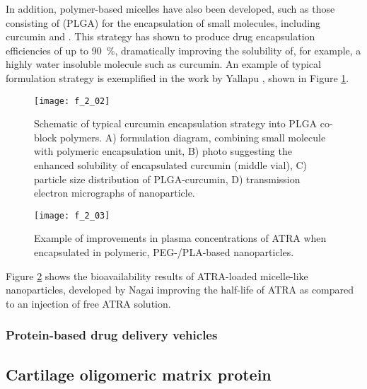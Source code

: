 \begin{refsection}
In addition, polymer-based micelles have also been developed, such as those
consisting of  (PLGA) for the
encapsulation of small molecules, including curcumin and
.\cite{Li2009,Yallapu2010b} This strategy has
shown to produce drug encapsulation efficiencies of up to \SI{90}{\percent},
dramatically improving the solubility of, for example, a highly water insoluble
molecule such as curcumin. An example of typical formulation strategy is
exemplified in the work by Yallapu , shown in Figure
\ref{fig:PLA_curcumin_example}.\cite{Yallapu2010b}
\begin{figure}[h!] \centering \texttt{[image: f\_2\_02]}
    \caption[Schematic of typical curcumin encapsulation strategy into PLGA
        co-block polymers.
    ]{Schematic of typical curcumin encapsulation strategy into PLGA co-block
    polymers. A) formulation diagram, combining small molecule with polymeric
encapsulation unit, B) photo suggesting the enhanced solubility of encapsulated
curcumin (middle vial), C) particle size distribution of PLGA-curcumin, D)
transmission electron micrographs of
nanoparticle.\cite{Yallapu2010b}}\label{fig:PLA_curcumin_example} \end{figure}
\begin{figure}[h!] \centering \texttt{[image: f\_2\_03]}
    \caption[Example of improvements in plasma concentrations of ATRA when
    encapsulated in polymeric, PEG-/PLA-based nanoparticles.]{Example of improvements in plasma concentrations of ATRA when
    encapsulated in polymeric, PEG-/PLA-based
    nanoparticles.\cite{Li2009}}\label{fig:PLA_ATRA_example} \end{figure}
Figure \ref{fig:PLA_ATRA_example} shows the bioavailability results of
ATRA-loaded micelle-like nanoparticles, developed by Nagai \cite{Li2009} improving the half-life of ATRA as compared to an injection of
free ATRA solution.

\subsubsection{Protein-based drug delivery vehicles}

\subsection{Cartilage oligomeric matrix protein}


\end{refsection}
